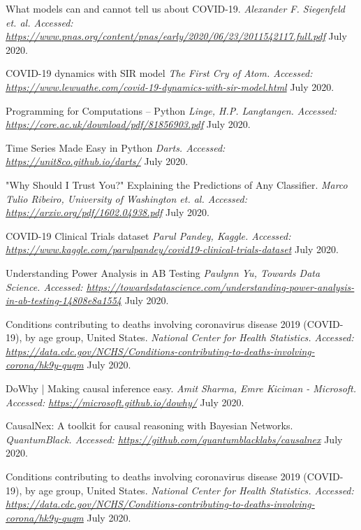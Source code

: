 \begin{thebibliography}{1}
 What models can and cannot tell us about COVID-19. {\em Alexander F. Siegenfeld et. al. Accessed:  \url{https://www.pnas.org/content/pnas/early/2020/06/23/2011542117.full.pdf}} July 2020.

 COVID-19 dynamics with SIR model {\em The First Cry of Atom. Accessed:  \url{https://www.lewuathe.com/covid-19-dynamics-with-sir-model.html}} July 2020.

 Programming for Computations – Python {\em Linge, H.P. Langtangen. Accessed:  \url{https://core.ac.uk/download/pdf/81856903.pdf}} July 2020.

 Time Series Made Easy in Python {\em Darts. Accessed:  \url{https://unit8co.github.io/darts/}} July 2020.

 "Why Should I Trust You?" Explaining the Predictions of Any Classifier. {\em Marco Tulio Ribeiro, University of Washington et. al. Accessed:  \url{https://arxiv.org/pdf/1602.04938.pdf}} July 2020.

 COVID-19 Clinical Trials dataset {\em Parul Pandey, Kaggle.
Accessed:  \url{https://www.kaggle.com/parulpandey/covid19-clinical-trials-dataset}} July 2020.

 Understanding Power Analysis in AB Testing {\em Paulynn Yu, Towards Data Science.
Accessed:  \url{https://towardsdatascience.com/understanding-power-analysis-in-ab-testing-14808e8a1554}} July 2020.

 Conditions contributing to deaths involving coronavirus disease 2019 (COVID-19), by age group, United States. {\em 	National Center for Health Statistics. Accessed:  \url{https://data.cdc.gov/NCHS/Conditions-contributing-to-deaths-involving-corona/hk9y-quqm}} July 2020.

 DoWhy | Making causal inference easy. {\em 	Amit Sharma, Emre Kiciman - Microsoft. Accessed:  \url{https://microsoft.github.io/dowhy/}} July 2020.

 CausalNex: A toolkit for causal reasoning with Bayesian Networks. {\em QuantumBlack. Accessed:  \url{https://github.com/quantumblacklabs/causalnex}} July 2020.

 Conditions contributing to deaths involving coronavirus disease 2019 (COVID-19), by age group, United States. {\em 	National Center for Health Statistics. Accessed:  \url{https://data.cdc.gov/NCHS/Conditions-contributing-to-deaths-involving-corona/hk9y-quqm}} July 2020.

\end{thebibliography}